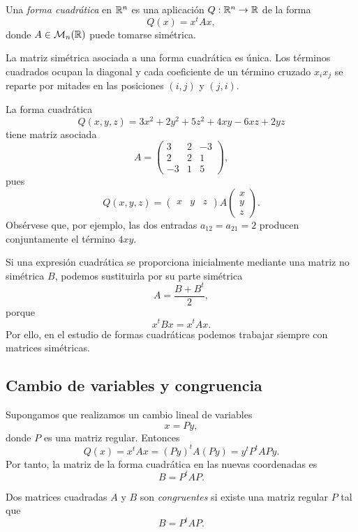 \begin{definition}
Una \emph{forma cuadrática} en $\mathbb{R}^n$ es una aplicación $Q:\mathbb{R}^n\to\mathbb{R}$ de la forma
\[
Q(x)=x^tAx,
\]
donde $A\in\mathcal M_n(\mathbb{R})$ puede tomarse simétrica.
\end{definition}

La matriz simétrica asociada a una forma cuadrática es única. Los términos cuadrados ocupan la diagonal y cada coeficiente de un término cruzado $x_ix_j$ se reparte por mitades en las posiciones $(i,j)$ y $(j,i)$.

\begin{example}
La forma cuadrática
\[
Q(x,y,z)=3x^2+2y^2+5z^2+4xy-6xz+2yz
\]
tiene matriz asociada
\[
A=\begin{pmatrix}
3&2&-3\\
2&2&1\\
-3&1&5
\end{pmatrix},
\]
pues
\[
Q(x,y,z)=
\begin{pmatrix}x&y&z\end{pmatrix}
A
\begin{pmatrix}x\\y\\z\end{pmatrix}.
\]
Obsérvese que, por ejemplo, las dos entradas $a_{12}=a_{21}=2$ producen conjuntamente el término $4xy$.
\end{example}

Si una expresión cuadrática se proporciona inicialmente mediante una matriz no simétrica $B$, podemos sustituirla por su parte simétrica
\[
A=\frac{B+B^t}{2},
\]
porque
\[
x^tBx=x^tAx.
\]
Por ello, en el estudio de formas cuadráticas podemos trabajar siempre con matrices simétricas.

\subsection{Cambio de variables y congruencia}

Supongamos que realizamos un cambio lineal de variables
\[
x=Py,
\]
donde $P$ es una matriz regular. Entonces
\[
Q(x)=x^tAx=(Py)^tA(Py)=y^tP^tAPy.
\]
Por tanto, la matriz de la forma cuadrática en las nuevas coordenadas es
\[
\boxed{B=P^tAP.}
\]

\begin{definition}
Dos matrices cuadradas $A$ y $B$ son \emph{congruentes} si existe una matriz regular $P$ tal que
\[
B=P^tAP.
\]
\end{definition}

